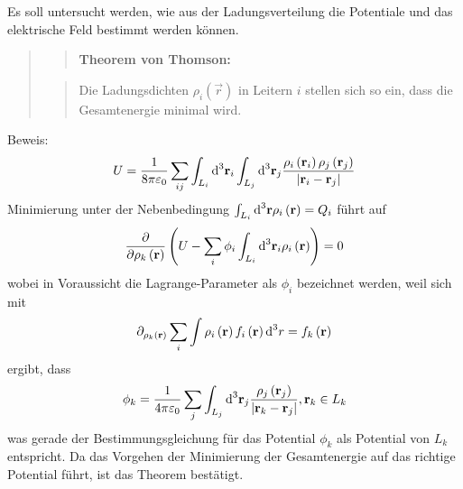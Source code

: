 Es soll untersucht werden, wie aus der Ladungsverteilung die Potentiale und das elektrische Feld bestimmt werden können.
\begin{quotation}

	\begin{quote}
		\textbf{\textup{Theorem von Thomson:}}
	\end{quote}

	\begin{quote}
		Die Ladungsdichten $\rho _{i}\left(\vec {r}\right)$ in Leitern $i$ stellen sich so ein, dass die Gesamtenergie minimal wird.
	\end{quote}

\end{quotation}
Beweis:
\begin{equation*}
	U=\frac{1}{8\pi \varepsilon _{0}}\sum _{ij}\int _{L_{i}}\text{d} ^{3}\mathbf{r}_{i}\int _{L_{j}}\text{d} ^{3}\mathbf{r}_{j}\frac{\rho _{i}\left(\mathbf{r}_{i}\right)\rho _{j}\left(\mathbf{r}_{j}\right)}{\left| \mathbf{r}_{i}-\mathbf{r}_{j}\right| }
\end{equation*}
Minimierung unter der Nebenbedingung $\int _{{L_{i}}}\text{d} ^{3}\mathbf{r}\rho _{i}\left(\mathbf{r}\right)=Q_{i}$ führt auf
\begin{equation*}
	\frac{\partial }{\partial \rho _{k}\left(\mathbf{r}\right)}\left(U-\sum _{i}\phi _{i}\int _{L_{i}}\text{d} ^{3}\mathbf{r}_{i}\rho _{i}\left(\mathbf{r}\right)\right)=0
\end{equation*}
wobei in Voraussicht die Lagrange-Parameter als $\phi _{i}$ bezeichnet werden, weil sich mit
\begin{equation*}
    \partial _{{\rho _{k}}\left(\mathbf{r}\right)}\sum _{i}\int \rho _{i}\left(\mathbf{r}\right)f_{i}\left(\mathbf{r}\right)\text{d} ^{3}r=f_{k}\left(\mathbf{r}\right)
\end{equation*}
ergibt, dass
\begin{equation*}
	\phi _{k}=\frac{1}{4\pi \varepsilon _{0}}\sum _{j}\int _{L_{j}}\text{d} ^{3}\mathbf{r}_{j}\frac{\rho _{j}\left(\mathbf{r}_{j}\right)}{\left| \mathbf{r}_{k}-\mathbf{r}_{j}\right| }, \mathbf{r}_{k}\in L_{k}
\end{equation*}
was gerade der Bestimmungsgleichung für das Potential $\phi _{k}$ als Potential von $L_{k}$ entspricht. Da das Vorgehen der Minimierung der Gesamtenergie auf das richtige Potential führt, ist das Theorem bestätigt.


